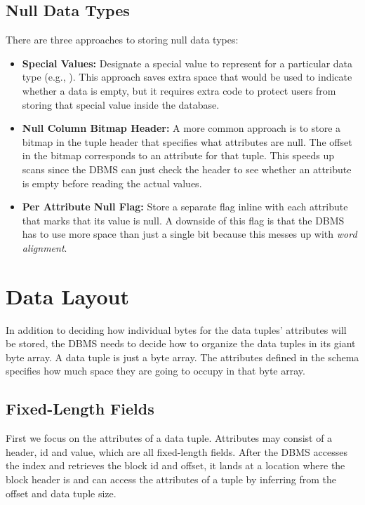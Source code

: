 \documentclass[11pt]{article}
\begin{document}
\subsection*{Null Data Types}
There are three approaches to storing null data types:
\begin{itemize}
    \item \textbf{Special Values:} Designate a special value to represent  for a particular data type (e.g., ). This approach saves extra space that would be used to indicate whether a data is empty, but it requires extra code to protect users from storing that special value inside the database.
    \item \textbf{Null Column Bitmap Header:} A more common approach is to store a bitmap in the tuple header that specifies what attributes are null. The offset in the bitmap corresponds to an attribute for that tuple. This speeds up scans since the DBMS can just check the header to see whether an attribute is empty before reading the actual values.
    \item \textbf{Per Attribute Null Flag:} Store a separate flag inline with each attribute that marks that its value is null. A downside of this flag is that the DBMS has to use more space than just a single bit because this messes up with \textit{word alignment}.
\end{itemize}

\section{Data Layout}
In addition to deciding how individual bytes for the data tuples' attributes will be stored, the DBMS needs to decide how to organize the data tuples in its giant byte array. A data tuple is just a byte array. The attributes defined in the schema specifies how much space they are going to occupy in that byte array.

\subsection*{Fixed-Length Fields}
 First we focus on the attributes of a data tuple. Attributes may consist of a header, id and value, which are all fixed-length fields. After the DBMS accesses the index and retrieves the block id and offset, it lands at a location where the block header is and can access the attributes of a tuple by inferring from the offset and data tuple size.
\end{document}
